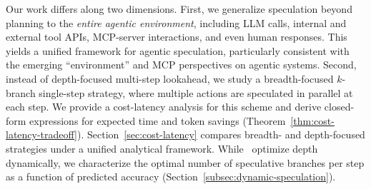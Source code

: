 \documentclass{article} %
\theoremstyle{plain} %
\theoremstyle{definition} %
\theoremstyle{remark} %
\begin{document}
Our work differs along two dimensions. First, we generalize speculation beyond planning to the \emph{entire agentic environment}, including LLM calls, internal and external tool APIs, MCP-server interactions, and even human responses. This yields a unified framework for agentic speculation, particularly consistent with the emerging ``environment'' and MCP perspectives on agentic systems. Second, instead of depth-focused multi-step lookahead, we study a breadth-focused $k$-branch single-step strategy, where multiple actions are speculated in parallel at each step. We provide a cost-latency analysis for this scheme and derive closed-form expressions for expected time and token savings (Theorem~\ref{thm:cost-latency-tradeoff}). Section~\ref{sec:cost-latency} compares breadth- and depth-focused strategies under a unified analytical framework. While~\citet{guan2025dynamicspeculativeagentplanning} optimize depth dynamically, we characterize the optimal number of speculative branches per step as a function of predicted accuracy (Section~\ref{subsec:dynamic-speculation}).


\end{document}
